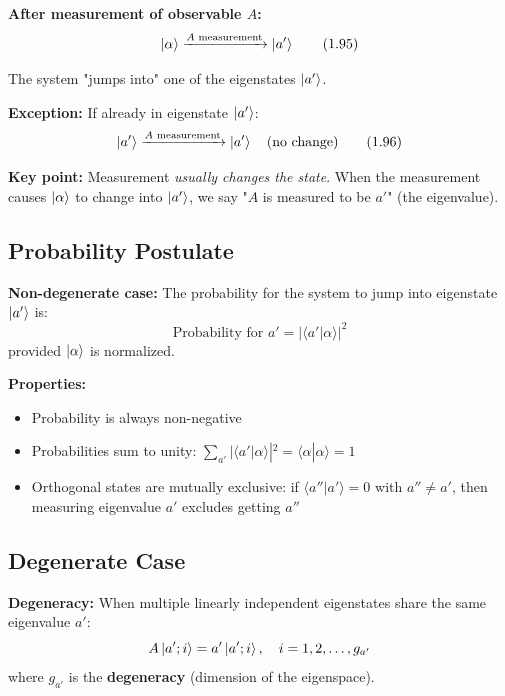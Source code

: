 \documentclass[11pt,a4paper]{article}
\begin{document}
\textbf{After measurement of observable $A$:}
\begin{equation}
\ket{\alpha} \xrightarrow{A \text{ measurement}} \ket{a'}
\tag{1.95}
\end{equation}

The system "jumps into" one of the eigenstates $\ket{a'}$.

\textbf{Exception:} If already in eigenstate $\ket{a'}$:
\begin{equation}
\ket{a'} \xrightarrow{A \text{ measurement}} \ket{a'} \quad \text{(no change)}
\tag{1.96}
\end{equation}

\textbf{Key point:} Measurement \textit{usually changes the state}. When the measurement causes $\ket{\alpha}$ to change into $\ket{a'}$, we say "$A$ is measured to be $a'$" (the eigenvalue).

\subsection{Probability Postulate}

\textbf{Non-degenerate case:} The probability for the system to jump into eigenstate $\ket{a'}$ is:
\begin{equation}
\boxed{\text{Probability for } a' = |\langle a'|\alpha\rangle|^2}
\tag{1.97}
\end{equation}
provided $\ket{\alpha}$ is normalized.

\textbf{Properties:}
\begin{itemize}
\item Probability is always non-negative
\item Probabilities sum to unity: $\sum_{a'}|\langle a'|\alpha\rangle|^2 = \langle\alpha|\alpha\rangle = 1$
\item Orthogonal states are mutually exclusive: if $\langle a''|a'\rangle = 0$ with $a'' \neq a'$, then measuring eigenvalue $a'$ excludes getting $a''$
\end{itemize}

\subsection{Degenerate Case}

\textbf{Degeneracy:} When multiple linearly independent eigenstates share the same eigenvalue $a'$:
\begin{equation}
A\ket{a'; i} = a'\ket{a'; i}, \quad i = 1, 2, \ldots, g_{a'}
\end{equation}
where $g_{a'}$ is the \textbf{degeneracy} (dimension of the eigenspace).
\end{document}

